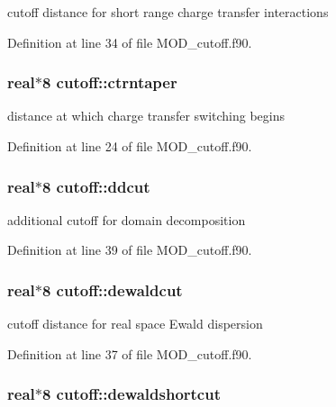 cutoff distance for short range charge transfer interactions 



Definition at line 34 of file M\-O\-D\-\_\-cutoff.\-f90.

\hypertarget{classcutoff_a1c579ced91600e8e2a6fce114f29f34c}{
\subsubsection[{ctrntaper}]{\setlength{\rightskip}{0pt plus 5cm}real$\ast$8 cutoff\-::ctrntaper}}\label{classcutoff_a1c579ced91600e8e2a6fce114f29f34c}


distance at which charge transfer switching begins 



Definition at line 24 of file M\-O\-D\-\_\-cutoff.\-f90.

\hypertarget{classcutoff_aa9e3ae613ef354550d4e154605757e63}{
\subsubsection[{ddcut}]{\setlength{\rightskip}{0pt plus 5cm}real$\ast$8 cutoff\-::ddcut}}\label{classcutoff_aa9e3ae613ef354550d4e154605757e63}


additional cutoff for domain decomposition 



Definition at line 39 of file M\-O\-D\-\_\-cutoff.\-f90.

\hypertarget{classcutoff_ab63d9aaa66f502a6018bf46e4581393a}{
\subsubsection[{dewaldcut}]{\setlength{\rightskip}{0pt plus 5cm}real$\ast$8 cutoff\-::dewaldcut}}\label{classcutoff_ab63d9aaa66f502a6018bf46e4581393a}


cutoff distance for real space Ewald dispersion 



Definition at line 37 of file M\-O\-D\-\_\-cutoff.\-f90.

\hypertarget{classcutoff_ada4ff7525cda0e4f6d2dd37e31d5afbc}{
\subsubsection[{dewaldshortcut}]{\setlength{\rightskip}{0pt plus 5cm}real$\ast$8 cutoff\-::dewaldshortcut}}\label{classcutoff_ada4ff7525cda0e4f6d2dd37e31d5afbc}


